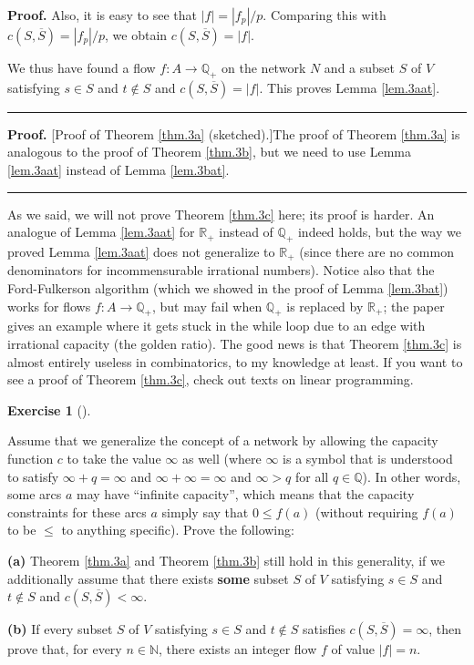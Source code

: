\documentclass[numbers=enddot,12pt,final,onecolumn,notitlepage]{scrartcl}%
\newcounter{exer}
\theoremstyle{definition}
\newtheorem{exmp}[exer]{Exercise}
\newenvironment{exercise}[1][]
{\begin{exmp}[#1]\begin{leftbar}}
{\end{leftbar}\end{exmp}}
\newenvironment{proof}[1][Proof]{\noindent\textbf{#1.} }{\ \rule{0.5em}{0.5em}}
\begin{document}
\begin{proof}
Also, it is easy to see that $\left\vert f\right\vert =\left\vert
f_{p}\right\vert /p$. Comparing this with $c\left(  S,\overline{S}\right)
=\left\vert f_{p}\right\vert /p$, we obtain $c\left(  S,\overline{S}\right)
=\left\vert f\right\vert $.

We thus have found a flow $f:A\rightarrow\mathbb{Q}_{+}$ on the network $N$
and a subset $S$ of $V$ satisfying $s\in S$ and $t\notin S$ and $c\left(
S,\overline{S}\right)  =\left\vert f\right\vert $. This proves Lemma
\ref{lem.3aat}.
\end{proof}

\begin{proof}
[Proof of Theorem \ref{thm.3a} (sketched).]The proof of Theorem \ref{thm.3a}
is analogous to the proof of Theorem \ref{thm.3b}, but we need to use Lemma
\ref{lem.3aat} instead of Lemma \ref{lem.3bat}.
\end{proof}

As we said, we will not prove Theorem \ref{thm.3c} here; its proof is harder.
An analogue of Lemma \ref{lem.3aat} for $\mathbb{R}_{+}$ instead of
$\mathbb{Q}_{+}$ indeed holds, but the way we proved Lemma \ref{lem.3aat} does
not generalize to $\mathbb{R}_{+}$ (since there are no common denominators for
incommensurable irrational numbers). Notice also that the Ford-Fulkerson
algorithm (which we showed in the proof of Lemma \ref{lem.3bat}) works for
flows $f:A\rightarrow\mathbb{Q}_{+}$, but may fail when $\mathbb{Q}_{+}$ is
replaced by $\mathbb{R}_{+}$; the paper \cite{Zwick95} gives an example where
it gets stuck in the while loop due to an edge with irrational capacity (the
golden ratio). The good news is that Theorem \ref{thm.3c} is almost entirely
useless in combinatorics, to my knowledge at least. If you want to see a proof
of Theorem \ref{thm.3c}, check out texts on linear programming.

\begin{exercise}
Assume that we generalize the concept of a network by allowing the capacity
function $c$ to take the value $\infty$ as well (where $\infty$ is a symbol
that is understood to satisfy $\infty+q=\infty$ and $\infty+\infty=\infty$ and
$\infty>q$ for all $q\in\mathbb{Q}$). In other words, some arcs $a$ may have
\textquotedblleft infinite capacity\textquotedblright, which means that the
capacity constraints for these arcs $a$ simply say that $0\leq f\left(
a\right)  $ (without requiring $f\left(  a\right)  $ to be $\leq$ to anything
specific). Prove the following:

\textbf{(a)} Theorem \ref{thm.3a} and Theorem \ref{thm.3b} still hold in this
generality, if we additionally assume that there exists \textbf{some} subset
$S$ of $V$ satisfying $s\in S$ and $t\notin S$ and $c\left(  S,\overline
{S}\right)  <\infty$.

\textbf{(b)} If every subset $S$ of $V$ satisfying $s\in S$ and $t\notin S$
satisfies $c\left(  S,\overline{S}\right)  =\infty$, then prove that, for
every $n\in\mathbb{N}$, there exists an integer flow $f$ of value $\left\vert
f\right\vert =n$.
\end{exercise}
\end{document}
